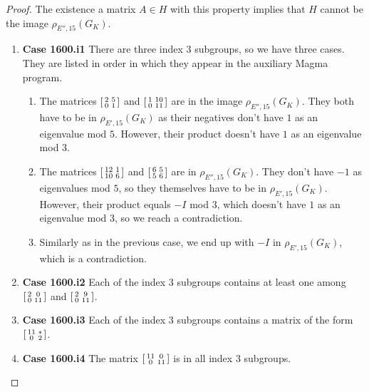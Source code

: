 \documentclass[10pt,a4paper]{amsart}
\newcommand\sm[1]{\begin{bsmallmatrix}#1\end{bsmallmatrix}}
\begin{document}
\begin{proof}
The existence a matrix $A \in H$ with this property implies that $H$ cannot be the image $\rho_{E'', 15}(G_K)$.

\begin{enumerate}
    \item \textbf{Case 1600.i1} There are three index $3$ subgroups, so we have three cases. They are listed in order in which they appear in the auxiliary Magma program.
    \begin{enumerate}
        \item The matrices $\sm{2 & 5 \\ 0 & 1}$ and $\sm{1 & 10 \\ 0 & 11}$ are in the image $\rho_{E'', 15}(G_K)$. They both have to be in $\rho_{E', 15}(G_K)$ as their negatives don't have $1$ as an eigenvalue mod $5$. However, their product doesn't have $1$ as an eigenvalue mod $3$. 
        \item The matrices $\sm{12 & 1 \\ 10 & 6}$ and $\sm{6 & 5 \\ 5 & 6}$ are in $\rho_{E'', 15}(G_K)$. They don't have $-1$ as eigenvalues mod $5$, so they themselves have to be in $\rho_{E', 15}(G_K)$. However, their product equals $-I$ mod $3$, which doesn't have $1$ as an eigenvalue mod $3$, so we reach a contradiction. 
        \item Similarly as in the previous case, we end up with $-I$ in $\rho_{E', 15}(G_K)$, which is a contradiction.
    \end{enumerate}
    
    \item \textbf{Case 1600.i2}
    Each of the index $3$ subgroups contains at least one among $\sm{2 & 0 \\ 0 & 11}$ and $\sm{2 & 9 \\ 0 & 11}$. 
    \item \textbf{Case 1600.i3} Each of the index $3$ subgroups contains a matrix of the form $\sm{11 & * \\ 0 & 2}$.
    \item \textbf{Case 1600.i4} The matrix $\sm{11 & 0 \\ 0 & 11}$ is in all index $3$ subgroups.
\end{enumerate}
\end{proof}
\end{document}
